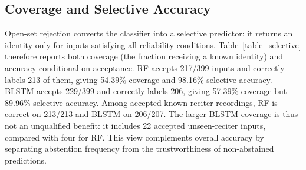 \documentclass[a4paper,conference]{IEEEtran}
\begin{document}
\begin{table}[htbp]
\centering
\caption{Per-reciter decisions at the fixed operating point (57 recordings each). Entries are raw correct/rejected/accepted error.}
\label{table_errors}
\renewcommand{\arraystretch}{1.08}
\setlength{\tabcolsep}{3pt}
\end{table}

\subsection{Coverage and Selective Accuracy}

Open-set rejection converts the classifier into a selective predictor: it returns an identity only for inputs satisfying all reliability conditions. Table~\ref{table_selective} therefore reports both coverage (the fraction receiving a known identity) and accuracy conditional on acceptance. RF accepts 217/399 inputs and correctly labels 213 of them, giving 54.39\% coverage and 98.16\% selective accuracy. BLSTM accepts 229/399 and correctly labels 206, giving 57.39\% coverage but 89.96\% selective accuracy. Among accepted known-reciter recordings, RF is correct on 213/213 and BLSTM on 206/207. The larger BLSTM coverage is thus not an unqualified benefit: it includes 22 accepted unseen-reciter inputs, compared with four for RF. This view complements overall accuracy by separating abstention frequency from the trustworthiness of non-abstained predictions.

\begin{table}[htbp]
\centering
\caption{Selective-prediction behavior on the 399 external recordings.}
\label{table_selective}
\renewcommand{\arraystretch}{1.08}
\setlength{\tabcolsep}{3pt}
\end{table}
\end{document}
